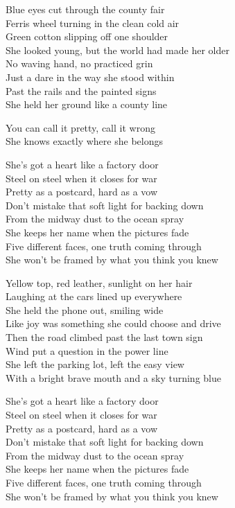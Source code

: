 \begin{lyrics}
Blue eyes cut through the county fair\\
Ferris wheel turning in the clean cold air\\
Green cotton slipping off one shoulder\\
She looked young, but the world had made her older\\
No waving hand, no practiced grin\\
Just a dare in the way she stood within\\
Past the rails and the painted signs\\
She held her ground like a county line

You can call it pretty, call it wrong\\
She knows exactly where she belongs

She’s got a heart like a factory door\\
Steel on steel when it closes for war\\
Pretty as a postcard, hard as a vow\\
Don’t mistake that soft light for backing down\\
From the midway dust to the ocean spray\\
She keeps her name when the pictures fade\\
Five different faces, one truth coming through\\
She won’t be framed by what you think you knew

Yellow top, red leather, sunlight on her hair\\
Laughing at the cars lined up everywhere\\
She held the phone out, smiling wide\\
Like joy was something she could choose and drive\\
Then the road climbed past the last town sign\\
Wind put a question in the power line\\
She left the parking lot, left the easy view\\
With a bright brave mouth and a sky turning blue

She’s got a heart like a factory door\\
Steel on steel when it closes for war\\
Pretty as a postcard, hard as a vow\\
Don’t mistake that soft light for backing down\\
From the midway dust to the ocean spray\\
She keeps her name when the pictures fade\\
Five different faces, one truth coming through\\
She won’t be framed by what you think you knew


\end{lyrics}
